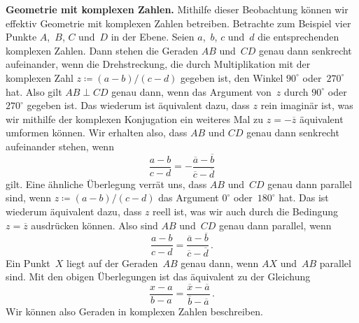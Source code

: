 \textbf{Geometrie mit komplexen Zahlen.}
Mithilfe dieser Beobachtung können wir effektiv Geometrie mit komplexen Zahlen betreiben. Betrachte zum Beispiel vier Punkte $A$,~$B$, $C$ und~$D$ in der Ebene. Seien $a$,~$b$, $c$ und~$d$ die entsprechenden komplexen Zahlen. Dann stehen die Geraden $AB$ und~$CD$ genau dann senkrecht aufeinander, wenn die Drehstreckung, die durch Multiplikation mit der komplexen Zahl $z\coloneqq (a-b)/(c-d)$ gegeben ist, den Winkel $90^\circ$ oder~$270^\circ$ hat. Also gilt $AB\perp CD$ genau dann, wenn das Argument von~$z$ durch $90^\circ$ oder~$270^\circ$ gegeben ist. Das wiederum ist äquivalent dazu, dass $z$ rein imaginär ist, was wir mithilfe der komplexen Konjugation ein weiteres Mal zu $z=-\overline{z}$ äquivalent umformen können. Wir erhalten also, dass $AB$ und $CD$ genau dann senkrecht aufeinander stehen, wenn
\begin{equation*}
	\frac{a-b}{c-d}=-\frac{\overline{a}-\overline{b}}{\overline{c}-\overline{d}}
\end{equation*}
gilt. Eine ähnliche Überlegung verrät uns, dass $AB$ und~$CD$ genau dann parallel sind, wenn $z\coloneqq (a-b)/(c-d)$ das Argument $0^\circ$ oder~$180^\circ$ hat. Das ist wiederum äquivalent dazu, dass $z$ reell ist, was wir auch durch die Bedingung $z=\overline{z}$ ausdrücken können. Also sind $AB$ und~$CD$ genau dann parallel, wenn
\begin{equation*}
	\frac{a-b}{c-d}=\frac{\overline{a}-\overline{b}}{\overline{c}-\overline{d}}\,.
\end{equation*}
Ein Punkt~$X$ liegt auf der Geraden~$AB$ genau dann, wenn $AX$ und~$AB$ parallel sind. Mit den obigen Überlegungen ist das äquivalent zu der Gleichung
\begin{equation*}
	\frac{x-a}{b-a}=\frac{\overline{x}-\overline{a}}{\overline{b}-\overline{a}}\,.
\end{equation*}
Wir können also Geraden in komplexen Zahlen beschreiben.

